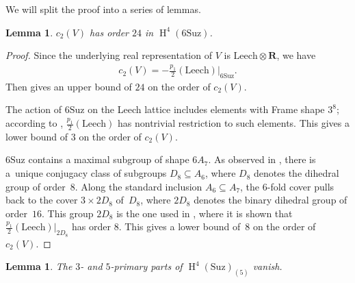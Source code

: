 \documentclass[pdftex]{sigma}
\numberwithin{equation}{section}
\newtheorem{Lemma}[Theorem]{Lemma}
\newcommand\bR{\mathbf R}
\DeclareMathOperator\homology{H}
\renewcommand\H{\homology}
\newcommand\<\langle
\renewcommand\>\rangle
\newcommand\Leech{\mathrm{Leech}}
\newcommand\Suz{\mathrm{Suz}}
\begin{document}
We will split the proof into a series of lemmas.

\begin{Lemma}\label{lem:suz lower bound} $c_2(V)$ has order $24$ in $\H^4(6\Suz)$.
\end{Lemma}

\begin{proof} Since the underlying real representation of $V$ is $\Leech \otimes \bR$, we have
\begin{gather*} c_2(V) = -\tfrac{p_1}2(\Leech)|_{6\Suz}.\end{gather*} Then \cite[Theorem 0.1]{jft} gives an upper bound of $24$ on the order of $c_2(V)$.

The action of $6\Suz$ on the Leech lattice includes elements with Frame shape $3^8$; according to \cite[Theorem 7.1]{jft}, $\frac{p_1}2(\Leech)$ has nontrivial restriction to such elements. This gives a lower bound of $3$ on the order of $c_2(V)$.

$6\Suz$ contains a maximal subgroup of shape $6A_7$. As observed in \cite[Lemma 4.1]{jft}, there is a~unique conjugacy class of subgroups $D_8 \subseteq A_6$, where $D_8$ denotes the dihedral group of order~$8$. Along the standard inclusion $A_6 \subseteq A_7$, the $6$-fold cover pulls back to the cover $3 \times 2D_8$ of~$D_8$, where $2D_8$ denotes the binary dihedral group of order~$16$. This group $2D_8$ is the one used in \cite[Lemma~4.1]{jft}, where it is shown that $\frac{p_1}2(\Leech)|_{2D_8}$ has order $8$. This gives a lower bound of~$8$ on the order of~$c_2(V)$.
\end{proof}

\begin{Lemma}\label{lem:suz 5}\label{lem:suz 3} The $3$- and $5$-primary parts of $\H^4(\Suz)_{(5)}$ vanish.
\end{Lemma}
\end{document}
